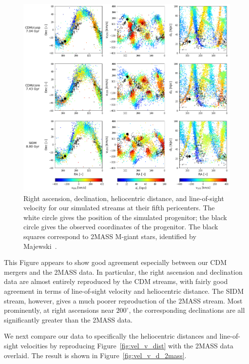 \begin{figure}
    \centering
    \includegraphics[width=1.0\linewidth]{figs/equatorial_2mass.png}
    \caption{%
        Right ascension, declination, heliocentric distance, and line-of-sight
        velocity for our simulated streams at their fifth pericenters. The white
        circle gives the position of the simulated progenitor; the black circle
        gives the observed coordinates of the progenitor.  The black squares
        correspond to 2MASS M-giant stars, identified by
        Majewski~\cite{majewski_two_2003}.
    }
    \label{fig:eq_2mass}
\end{figure}

This Figure appears to show good agreement especially between our CDM mergers
and the 2MASS data. In particular, the right ascension and declination data are
almost entirely reproduced by the CDM streams, with fairly good agreement in
terms of line-of-sight velocity and heliocentric distance. The SIDM stream,
however, gives a much poorer reproduction of the 2MASS stream. Most prominently,
at right ascensions near $200^\circ$, the corresponding declinations are all
significantly greater than the 2MASS data.

We next compare our data to specifically the heliocentric distances and
line-of-sight velocities by reproducing Figure~\ref{fig:vel_v_dist} with the
2MASS data overlaid. The result is shown in Figure~\ref{fig:vel_v_d_2mass}.

